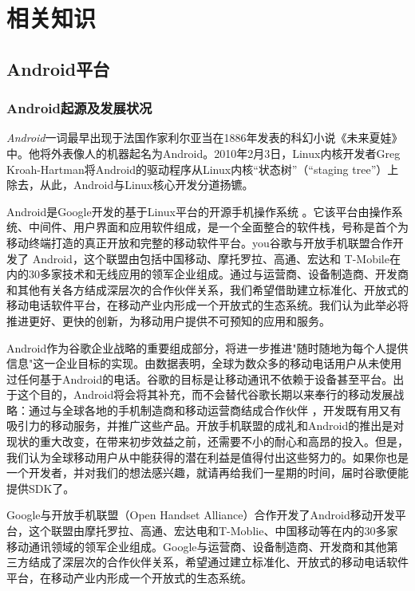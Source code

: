 \documentclass{XDBAthesis}
\begin{document}
\else
\fi
\chapter{相关知识}

\section{Android平台}

\subsection{Android起源及发展状况}

\emph{Android}一词最早出现于法国作家利尔亚当在1886年发表的科幻小说《未来夏娃》中。他将外表像人的机器起名为Android。2010年2月3日，Linux内核开发者Greg Kroah-Hartman将Android的驱动程序从Linux内核“状态树”（“staging tree”）上除去，从此，Android与Linux核心开发分道扬镳。

Android是Google开发的基于Linux平台的开源手机操作系统\cite{单李旺2009android} 。它该平台由操作系统、中间件、用户界面和应用软件组成，是一个全面整合的软件栈，号称是首个为移动终端打造的真正开放和完整的移动软件平台。you谷歌与开放手机联盟合作开发了 Android，这个联盟由包括中国移动、摩托罗拉、高通、宏达和 T-Mobile在内的30多家技术和无线应用的领军企业组成。通过与运营商、设备制造商、开发商和其他有关各方结成深层次的合作伙伴关系，我们希望借助建立标准化、开放式的移动电话软件平台，在移动产业内形成一个开放式的生态系统。我们认为此举必将推进更好、更快的创新，为移动用户提供不可预知的应用和服务。

Android作为谷歌企业战略的重要组成部分，将进一步推进"随时随地为每个人提供信息"这一企业目标的实现。由数据表明，全球为数众多的移动电话用户从未使用过任何基于Android的电话。谷歌的目标是让移动通讯不依赖于设备甚至平台。出于这个目的，Android将会将其补充，而不会替代谷歌长期以来奉行的移动发展战略：通过与全球各地的手机制造商和移动运营商结成合作伙伴\cite{罗翔2010symbian} ，开发既有用又有吸引力的移动服务，并推广这些产品。开放手机联盟的成礼和Android的推出是对现状的重大改变，在带来初步效益之前，还需要不小的耐心和高昂的投入。但是，我们认为全球移动用户从中能获得的潜在利益是值得付出这些努力的。如果你也是一个开发者，并对我们的想法感兴趣，就请再给我们一星期的时间，届时谷歌便能提供SDK了。

Google与开放手机联盟（Open Handset Alliance）合作开发了Android移动开发平台，这个联盟由摩托罗拉、高通、宏达电和T-Moblie、中国移动等在内的30多家移动通讯领域的领军企业组成。Google与运营商、设备制造商、开发商和其他第三方结成了深层次的合作伙伴关系，希望通过建立标准化、开放式的移动电话软件平台，在移动产业内形成一个开放式的生态系统。    
\end{document}
